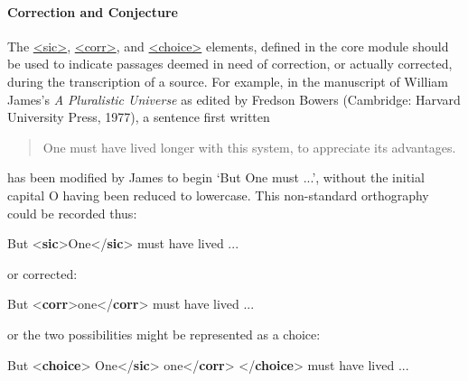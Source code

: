 \paragraph[{Correction and Conjecture}]{Correction and Conjecture}\label{PHCC}\par
The \hyperref[TEI.sic]{<sic>}, \hyperref[TEI.corr]{<corr>}, and \hyperref[TEI.choice]{<choice>} elements, defined in the \textsf{core} module should be used to indicate passages deemed in need of correction, or actually corrected, during the transcription of a source. For example, in the manuscript of William James's \textit{A Pluralistic Universe} as edited by Fredson Bowers (Cambridge: Harvard University Press, 1977), a sentence first written 
\begin{quote}One must have lived longer with this system, to appreciate its advantages.\end{quote}
 has been modified by James to begin ‘But One must ...’, without the initial capital O having been reduced to lowercase. This non-standard orthography could be recorded thus: \par\bgroup{}\exampleFont \begin{shaded}\noindent\mbox{}But {<\textbf{sic}>}One{</\textbf{sic}>} must have lived\mbox{}\newline 
 ...\end{shaded}\egroup\par \noindent  or corrected: \par\bgroup{}\exampleFont \begin{shaded}\noindent\mbox{}But\mbox{}\newline 
{<\textbf{corr}>}one{</\textbf{corr}>} must have lived ...\end{shaded}\egroup\par \noindent  or the two possibilities might be represented as a choice: \par\bgroup{}\exampleFont \begin{shaded}\noindent\mbox{}But\mbox{}\newline 
{<\textbf{choice}>}\mbox{}\newline 
{}One{</\textbf{sic}>}\mbox{}\newline 
{}one{</\textbf{corr}>}\mbox{}\newline 
{</\textbf{choice}>} must have lived\mbox{}\newline 
 ...\end{shaded}\egroup\par \par
